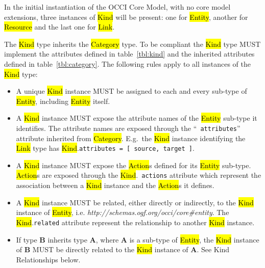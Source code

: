 \documentclass[10pt,a4paper]{article}
\begin{document}
In the initial instantiation of the OCCI Core Model, with no core model
extensions, three instances of \hl{Kind} will be present: one for \hl{Entity},
another for \hl{Resource} and the last one for \hl{Link}. 

The \hl{Kind} type inherits the \hl{Category} type. To be compliant the \hl{Kind}
type MUST implement the attributes defined in table~\ref{tbl:kind} and the inherited
attributes defined in table~\ref{tbl:category}. The following rules apply to all
instances of the \hl{Kind} type:
\begin{itemize}
\item A unique \hl{Kind} instance MUST be assigned to each and every sub-type
 of \hl{Entity}, including \hl{Entity} itself.
\item A \hl{Kind} instance MUST expose the attribute names of the \hl{Entity}
 sub-type it identifies. The attribute names are exposed through the ``{\tt
 attributes}'' attribute inherited from \hl{Category}. E.g.~the \hl{Kind}
 instance identifying the \hl{Link} type has \hl{Kind}.{\tt attributes =
 [ source, target ]}.
\item A \hl{Kind} instance MUST expose the \hl{Action}s defined for its
 \hl{Entity} sub-type. \hl{Action}s are exposed through the \hl{Kind}.{\tt
 actions} attribute which represent the association between a \hl{Kind}
 instance and the \hl{Action}s it defines.
\item A \hl{Kind} instance MUST be related, either directly or indirectly, to
 the \hl{Kind} instance of \hl{Entity},
 i.e. \textit{http://schemas.ogf.org/occi/core\#entity}.
 The \hl{Kind}.{\tt related} attribute represent the relationship to another
 \hl{Kind} instance.
\item If type {\bf B} inherits type {\bf A}, where {\bf A} is a sub-type of
 \hl{Entity}, the \hl{Kind} instance of {\bf B} MUST be directly related to the
 \hl{Kind} instance of {\bf A}. See Kind Relationships below.
\end{itemize}
\end{document}
